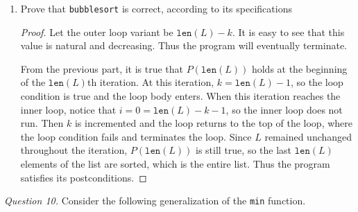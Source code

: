 \documentclass[11pt]{article}
\begin{document}
\begin{enumerate}[label=(\alph*)]
        \item Prove that \verb|bubblesort| is correct, according to its specifications
        
        \begin{proof}
            Let the outer loop variant be \(\texttt{len}(L) - k\). It is easy to see that this value is natural and decreasing. Thus the program will eventually terminate.

            From the previous part, it is true that \(P(\texttt{len}(L))\) holds at the beginning of the \(\texttt{len}(L)\)th iteration. At this iteration, \(k=\texttt{len}(L) - 1\), so the loop condition is true and the loop body enters. When this iteration reaches the inner loop, notice that \(i = 0 = \texttt{len}(L) - k - 1\), so the inner loop does not run. Then \(k\) is incremented and the loop returns to the top of the loop, where the loop condition fails and terminates the loop. Since \(L\) remained unchanged throughout the iteration, \(P(\texttt{len}(L))\) is still true, so the last \(\texttt{len}(L)\) elements of the list are sorted, which is the entire list. Thus the program satisfies its postconditions.
        
        \end{proof}
    \end{enumerate}
    \textit{Question 10.} Consider the following generalization of the \verb|min| function.
\end{document}
